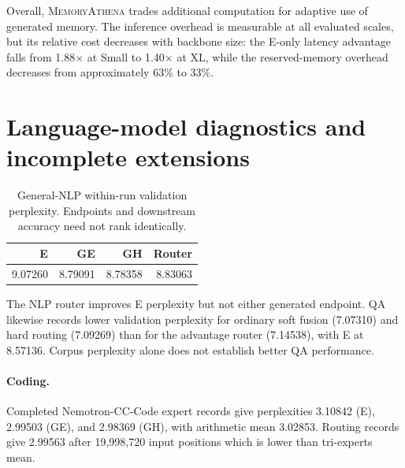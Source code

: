 Overall, \textsc{MemoryAthena} trades additional computation for adaptive use
of generated memory. The inference overhead is measurable at all evaluated
scales, but its relative cost decreases with backbone size: the E-only latency
advantage falls from 1.88$\times$ at Small to 1.40$\times$ at XL, while the
reserved-memory overhead decreases from approximately 63\% to 33\%.
\section{Language-model diagnostics and incomplete extensions}
\label{app:secondary}

\begin{table}[h]
\centering
\caption{General-NLP within-run validation perplexity. Endpoints and downstream accuracy need not rank identically.}
\begin{tabular}{rrrr}
\toprule
E & GE & GH & Router\\
\midrule
9.07260&8.79091&8.78358&8.83063\\
\bottomrule
\end{tabular}
\end{table}

The NLP router improves E perplexity but not either generated endpoint. QA likewise records lower validation perplexity for ordinary soft fusion (7.07310) and hard routing (7.09269) than for the advantage router (7.14538), with E at 8.57136. Corpus perplexity alone does not establish better QA performance.

\paragraph{Coding.}
Completed Nemotron-CC-Code expert records give perplexities 3.10842 (E), 2.99503 (GE), and 2.98369 (GH), with arithmetic mean 3.02853. Routing records give 2.99563 after 19,998,720 input positions which is lower than tri-experts mean.
